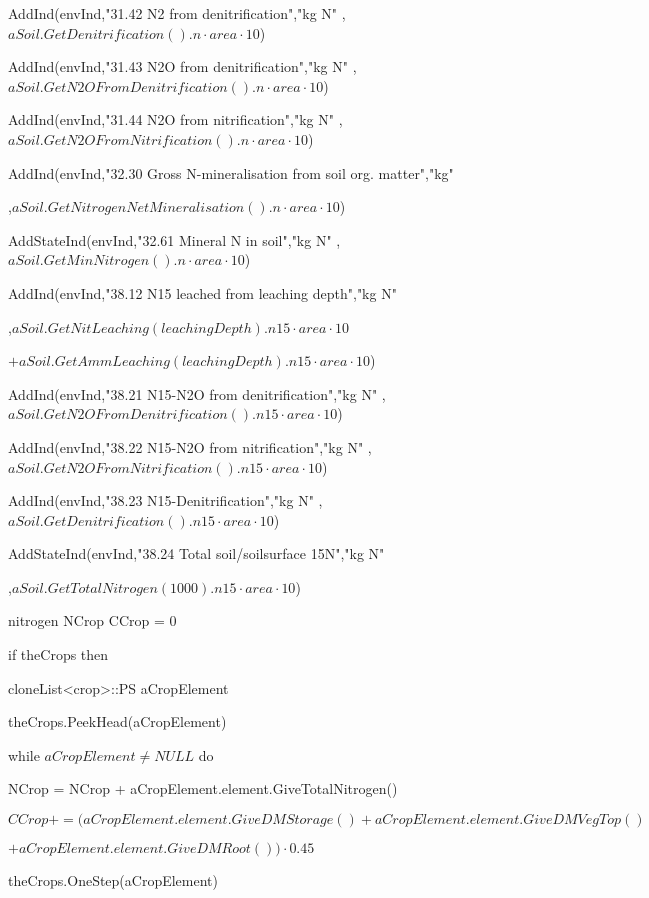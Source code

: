 \documentclass[%
]{scrartcl}
\begin{document}
{{{ AddInd(envInd,"31.42 N2 from denitrification","kg N"
,$aSoil.GetDenitrification().n \cdot area \cdot 10$)
  
 AddInd(envInd,"31.43 N2O from denitrification","kg N"
,$aSoil.GetN2OFromDenitrification().n \cdot area \cdot 10$)
 
  AddInd(envInd,"31.44 N2O from nitrification","kg N"
,$aSoil.GetN2OFromNitrification().n \cdot area \cdot 10$)
	
	 AddInd(envInd,"32.30 Gross N-mineralisation from soil org. matter","kg"

,$aSoil.GetNitrogenNetMineralisation().n \cdot area \cdot 10$)
 
  AddStateInd(envInd,"32.61 Mineral N in soil","kg N"
,$aSoil.GetMinNitrogen().n \cdot area \cdot 10$)

   AddInd(envInd,"38.12 N15 leached from leaching depth","kg N"

,$aSoil.GetNitLeaching(leachingDepth).n15 \cdot area \cdot 10$

$+aSoil.GetAmmLeaching(leachingDepth).n15 \cdot area \cdot 10$)
	
	 AddInd(envInd,"38.21 N15-N2O from denitrification","kg N"
,$aSoil.GetN2OFromDenitrification().n15 \cdot area \cdot 10$)
 
   AddInd(envInd,"38.22 N15-N2O from nitrification","kg N"
,$aSoil.GetN2OFromNitrification().n15 \cdot area \cdot 10$)  

   AddInd(envInd,"38.23 N15-Denitrification","kg N"
,$aSoil.GetDenitrification().n15 \cdot area \cdot 10$)
 	 
AddStateInd(envInd,"38.24 Total soil/soilsurface 15N","kg N"

,$aSoil.GetTotalNitrogen(1000).n15 \cdot area \cdot 10$)

   nitrogen NCrop
     CCrop = 0
  
 if theCrops then
  
    \quad  cloneList<crop>::PS aCropElement

   \quad	theCrops.PeekHead(aCropElement)

  \quad 	while $aCropElement\ne NULL$ do
     
  \quad\quad       NCrop = NCrop + aCropElement.element.GiveTotalNitrogen()
   
\quad\quad      $CCrop += (aCropElement.element.GiveDMStorage()+aCropElement.element.GiveDMVegTop()$

\quad\quad   $+aCropElement.element.GiveDMRoot()) \cdot 0.45$
 
   \quad\quad     theCrops.OneStep(aCropElement)

}}}
\end{document}
